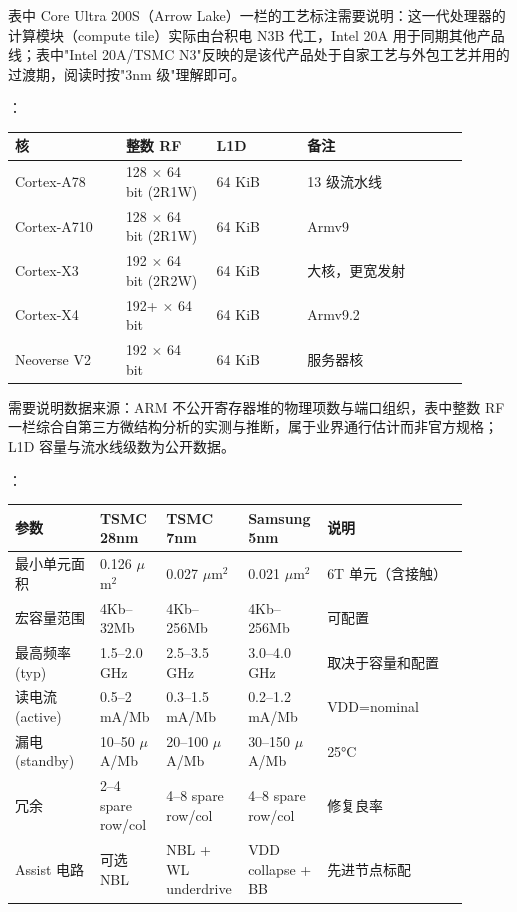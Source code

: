 表中 Core Ultra 200S（Arrow Lake）一栏的工艺标注需要说明：这一代处理器的计算模块（compute tile）实际由台积电 N3B 代工，Intel 20A 用于同期其他产品线；表中"Intel 20A/TSMC N3"反映的是该代产品处于自家工艺与外包工艺并用的过渡期，阅读时按"3nm 级"理解即可。

：

\begin{longtable}{L{0.22\linewidth}L{0.18\linewidth}L{0.18\linewidth}L{0.32\linewidth}}
\toprule
核 & 整数 RF & L1D & 备注 \\
\midrule
Cortex-A78 & 128 $\times$ 64 bit (2R1W) & 64 KiB & 13 级流水线 \\
Cortex-A710 & 128 $\times$ 64 bit (2R1W) & 64 KiB & Armv9 \\
Cortex-X3 & 192 $\times$ 64 bit (2R2W) & 64 KiB & 大核，更宽发射 \\
Cortex-X4 & 192+ $\times$ 64 bit & 64 KiB & Armv9.2 \\
Neoverse V2 & 192 $\times$ 64 bit & 64 KiB & 服务器核 \\
\bottomrule
\end{longtable}

需要说明数据来源：ARM 不公开寄存器堆的物理项数与端口组织，表中整数 RF 一栏综合自第三方微结构分析的实测与推断，属于业界通行估计而非官方规格；L1D 容量与流水线级数为公开数据。

：

\begin{longtable}{L{0.18\linewidth}L{0.14\linewidth}L{0.14\linewidth}L{0.14\linewidth}L{0.30\linewidth}}
\toprule
参数 & TSMC 28nm & TSMC 7nm & Samsung 5nm & 说明 \\
\midrule
最小单元面积 & 0.126 $\mu$m$^2$ & 0.027 $\mu$m$^2$ & 0.021 $\mu$m$^2$ & 6T 单元（含接触） \\
宏容量范围 & 4Kb--32Mb & 4Kb--256Mb & 4Kb--256Mb & 可配置 \\
最高频率 (typ) & 1.5--2.0 GHz & 2.5--3.5 GHz & 3.0--4.0 GHz & 取决于容量和配置 \\
读电流 (active) & 0.5--2 mA/Mb & 0.3--1.5 mA/Mb & 0.2--1.2 mA/Mb & VDD=nominal \\
漏电 (standby) & 10--50 $\mu$A/Mb & 20--100 $\mu$A/Mb & 30--150 $\mu$A/Mb & 25°C \\
冗余 & 2--4 spare row/col & 4--8 spare row/col & 4--8 spare row/col & 修复良率 \\
Assist 电路 & 可选 NBL & NBL + WL underdrive & VDD collapse + BB & 先进节点标配 \\
\bottomrule
\end{longtable}

